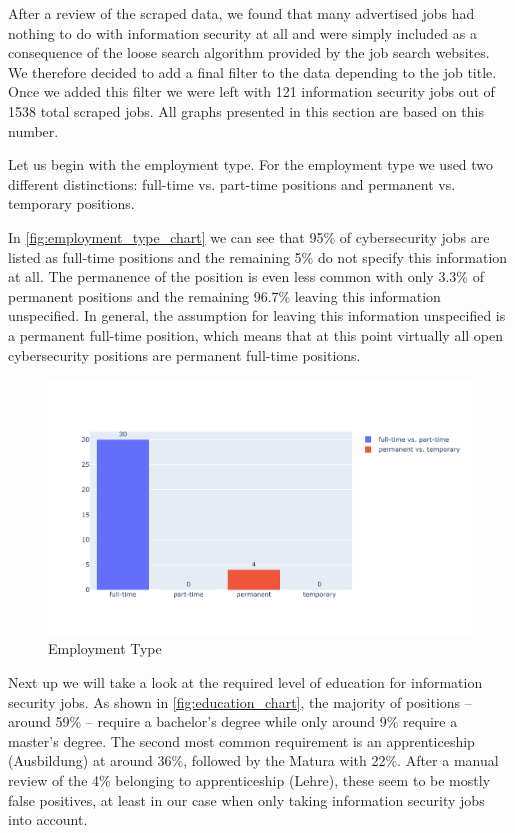 \documentclass[runningheads]{llncs}
\begin{document}
After a review of the scraped data, we found that many advertised jobs had nothing to do with information security at all and were simply included as a consequence of the loose search algorithm provided by the job search websites. We therefore decided to add a final filter to the data depending to the job title. Once we added this filter we were left with 121 information security jobs out of 1538 total scraped jobs. All graphs presented in this section are based on this number.

Let us begin with the employment type. For the employment type we used two different distinctions: full-time vs. part-time positions and permanent vs. temporary positions.

In \autoref{fig:employment_type_chart} we can see that 95\% of cybersecurity jobs are listed as full-time positions and the remaining 5\% do not specify this information at all. The permanence of the position is even less common with only 3.3\% of permanent positions and the remaining 96.7\% leaving this information unspecified. In general, the assumption for leaving this information unspecified is a permanent full-time position, which means that at this point virtually all open cybersecurity positions are permanent full-time positions.

\begin{figure}[H]
	\centering
  \includegraphics[width=\textwidth]{employment-type-bar-chart.pdf}
	\caption{Employment Type}
	\label{fig:employment_type_chart}
\end{figure}

Next up we will take a look at the required level of education for information security jobs. As shown in \autoref{fig:education_chart}, the majority of positions -- around 59\% -- require a bachelor's degree while only around 9\% require a master's degree. The second most common requirement is an apprenticeship (Ausbildung) at around 36\%, followed by the Matura with 22\%. After a manual review of the 4\% belonging to apprenticeship (Lehre), these seem to be mostly false positives, at least in our case when only taking information security jobs into account.
\end{document}
